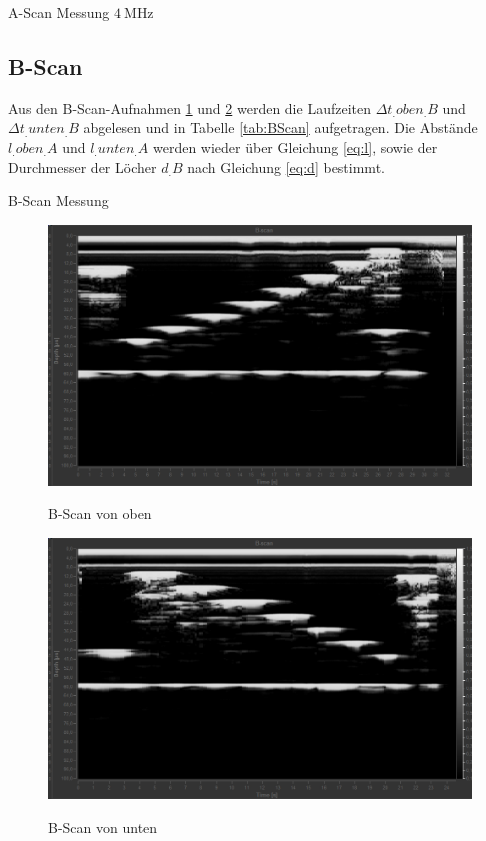 \begin{table}
	\centering
	\caption{A-Scan Messung $\SI{4}{\mega\hertz}$}
	
	\label{tab:AScan4MHz}
\end{table}

\subsection{B-Scan}

Aus den B-Scan-Aufnahmen \ref{fig:B-Scan-oben} und \ref{fig:B-Scan-unten} werden die Laufzeiten $\Delta t_.{oben_.B}$ und $\Delta t_.{unten_.B}$ abgelesen und in Tabelle \ref{tab:BScan} aufgetragen. Die Abstände $l_.{oben_.A}$ und $l_.{unten_.A}$ werden wieder über Gleichung \eqref{eq:l}, sowie der Durchmesser der Löcher $d_.B$ nach Gleichung \eqref{eq:d} bestimmt.
\begin{table}
	\centering
	\caption{B-Scan Messung}
	
	\label{tab:BScan}
\end{table}

\begin{figure}
	\centering
	\caption{B-Scan von oben}
	\includegraphics[width=\linewidth-40pt,height=\textheight-40pt,keepaspectratio]{content/images/B-Scan-oben.jpg}
	\label{fig:B-Scan-oben}
\end{figure}

\begin{figure}
	\centering
	\caption{B-Scan von unten}
	\includegraphics[width=\linewidth-40pt,height=\textheight-40pt,keepaspectratio]{content/images/B-Scan-unten.jpg}
	\label{fig:B-Scan-unten}
\end{figure}

